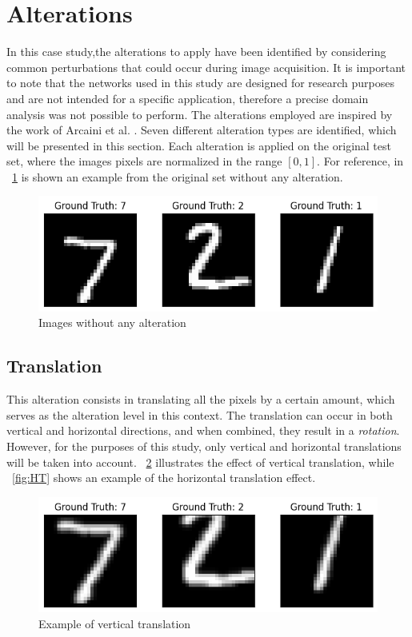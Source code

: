 \section{Alterations}

In this case study,the alterations to apply have been identified by considering common perturbations that could occur during image acquisition. It is important to note that the networks used in this study are designed for research purposes and are not intended for a specific application, therefore a precise domain analysis was not possible to perform. The alterations employed are inspired by the work of Arcaini et al. \cite{9176802}. Seven different alteration types are identified, which will be presented in this section. Each alteration is applied on the original test set, where the images pixels are normalized in the range $[0,1]$. For reference, in \Fig~\ref{fig:orig} is shown an example from the original set without any alteration.

\begin{figure}[h]
	\centering
	\includegraphics[width=0.6\linewidth]{ImageFiles/Alterations/orig}
	\caption{Images without any alteration}
	\label{fig:orig}
\end{figure}

\subsection{Translation}

This alteration consists in translating all the pixels by a certain amount, which serves as the alteration level in this context. The translation can occur in both vertical and horizontal directions, and when combined, they result in a \textit{rotation}. However, for the purposes of this study, only vertical and horizontal translations will be taken into account. \Fig~\ref{fig:VT} illustrates the effect of vertical translation, while \Fig~\ref{fig:HT} shows an example of the horizontal translation effect.

\begin{figure}[h]
	\centering
	\includegraphics[width=0.6\linewidth]{ImageFiles/Alterations/VT}
	\caption{Example of vertical translation}
	\label{fig:VT}
\end{figure}

